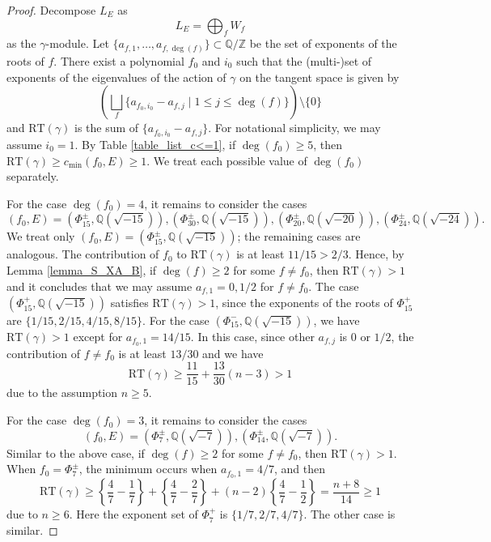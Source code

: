\documentclass[11pt]{amsart}
\theoremstyle{plain}
\theoremstyle{definition}
\numberwithin{equation}{section}
\newcommand{\bbQ}{\mathbb{Q}}
\newcommand{\bbZ}{\mathbb{Z}}
\begin{document}
\begin{proof}
Decompose $L_E$ as
\[
L_E = \bigoplus_f W_f
\]
as the $\gamma$-module.
Let $\{a_{f,1},\ldots,a_{f,\deg(f)}\} \subset \bbQ/\bbZ$ be the set of exponents of the roots of $f$.
There exist a polynomial $f_0$ and $i_0$ such that the (multi-)set of exponents of the eigenvalues of the action of $\gamma$ on the tangent space is given by
\[
\left(\bigsqcup_{f}\{ a_{f_0,i_0} - a_{f, j} \mid 1 \leq j \leq \deg(f)\} \right) \setminus \{0\}
\]
and $\mathrm{RT}(\gamma)$ is the sum of $\{a_{f_0,i_0} - a_{f, j}\}$.
For notational simplicity, we may assume $i_0=1$.
By Table \ref{table_list_c<=1}, if $\deg(f_0) \geq 5$, then $\mathrm{RT}(\gamma) \geq c_{\min}(f_0, E) \geq 1$.
We treat each possible value of $\deg(f_0)$ separately.

For the case $\deg(f_0) = 4$, it remains to consider the cases 
\[
(f_0, E) = (\Phi_{15}^\pm, \bbQ(\sqrt{-15})), (\Phi_{30}^\pm, \bbQ(\sqrt{-15})), (\Phi_{20}^\pm, \bbQ(\sqrt{-20})), (\Phi_{24}^\pm, \bbQ(\sqrt{-24})).
\]
We treat only $(f_0,E)=(\Phi_{15}^\pm,\bbQ(\sqrt{-15}))$; the remaining cases are analogous.
The contribution of $f_0$ to $\mathrm{RT}(\gamma)$ is at least $11/15 > 2/3$.
Hence, by Lemma \ref{lemma_S_XA_B}, if $\deg(f) \geq 2$ for some $f \neq f_0$, then $\mathrm{RT}(\gamma) > 1$ and it concludes that we may assume $a_{f,1} = 0,1/2$ for $f \neq f_0$.
The case $(\Phi_{15}^+,\bbQ(\sqrt{-15}))$ satisfies $\mathrm{RT}(\gamma)>1$, since the exponents of the roots of $\Phi_{15}^+$ are $\{1/15,2/15,4/15,8/15\}$.
For the case $(\Phi^-_{15}, \bbQ(\sqrt{-15}))$, we have $\mathrm{RT}(\gamma) > 1$ except for $a_{f_0,1} = 14/15$.
In this case, since other $a_{f,j}$ is $0$ or $1/2$, the contribution of $f \neq f_0$ is at least $13/30$ and we have
\[
\mathrm{RT}(\gamma) \geq \frac{11}{15} + \frac{13}{30}(n-3) > 1
\]
due to the assumption $n \geq 5$.

For the case $\deg(f_0) = 3$, it remains to consider the cases
\[
(f_0,E) = (\Phi_7^{\pm}, \bbQ(\sqrt{-7})), (\Phi_{14}^{\pm}, \bbQ(\sqrt{-7})).
\]
Similar to the above case, if $\deg(f) \geq 2$ for some $f \neq f_0$, then $\mathrm{RT}(\gamma) > 1$.
When $f_0=\Phi_7^\pm$, the minimum occurs when $a_{f_0,1}=4/7$, and then
\[
\mathrm{RT}(\gamma) \geq \left\{\frac47 - \frac17\right\} + \left\{\frac47-\frac27\right\} + (n-2)\left\{\frac47 -\frac12\right\} = \frac{n+8}{14} \geq 1
\]
due to $n \geq 6$.
Here the exponent set of $\Phi_7^+$ is $\{1/7,2/7,4/7\}$.
The other case is similar.


\end{proof}
\end{document}
